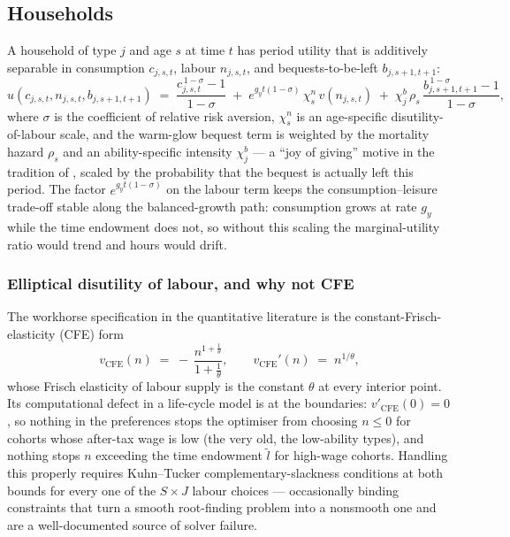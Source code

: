 \subsection{Households}
\label{subsec:households}

A household of type $j$ and age $s$ at time $t$ has period utility that is additively separable in consumption $c_{j,s,t}$, labour $n_{j,s,t}$, and bequests-to-be-left $b_{j,s+1,t+1}$:
\begin{equation}
\label{eq:utility}
u(c_{j,s,t},n_{j,s,t},b_{j,s+1,t+1}) \;=\; \frac{c_{j,s,t}^{\,1-\sigma}-1}{1-\sigma}
\;+\; e^{g_y t(1-\sigma)}\,\chi^n_s\, v(n_{j,s,t})
\;+\; \chi^b_j\,\rho_s\,\frac{b_{j,s+1,t+1}^{\,1-\sigma}-1}{1-\sigma},
\end{equation}
where $\sigma$ is the coefficient of relative risk aversion, $\chi^n_s$ is an age-specific disutility-of-labour scale, and the warm-glow bequest term is weighted by the mortality hazard $\rho_s$ and an ability-specific intensity $\chi^b_j$ --- a ``joy of giving'' motive in the tradition of \citet{DeNardi2004}, scaled by the probability that the bequest is actually left this period. The factor $e^{g_y t(1-\sigma)}$ on the labour term keeps the consumption--leisure trade-off stable along the balanced-growth path: consumption grows at rate $g_y$ while the time endowment does not, so without this scaling the marginal-utility ratio would trend and hours would drift.

\subsubsection{Elliptical disutility of labour, and why not CFE}
\label{subsubsec:ellipse}

The workhorse specification in the quantitative literature is the constant-Frisch-elasticity (CFE) form
\begin{equation}
\label{eq:cfe}
v_{\text{CFE}}(n) \;=\; -\,\frac{n^{1+\frac{1}{\theta}}}{1+\frac{1}{\theta}},
\qquad v_{\text{CFE}}'(n) \;=\; n^{1/\theta},
\end{equation}
whose Frisch elasticity of labour supply is the constant $\theta$ at every interior point. Its computational defect in a life-cycle model is at the boundaries: $v'_{\text{CFE}}(0)=0$, so nothing in the preferences stops the optimiser from choosing $n\le 0$ for cohorts whose after-tax wage is low (the very old, the low-ability types), and nothing stops $n$ exceeding the time endowment $\tilde{l}$ for high-wage cohorts. Handling this properly requires Kuhn--Tucker complementary-slackness conditions at both bounds for every one of the $S\times J$ labour choices --- occasionally binding constraints that turn a smooth root-finding problem into a nonsmooth one and are a well-documented source of solver failure.

